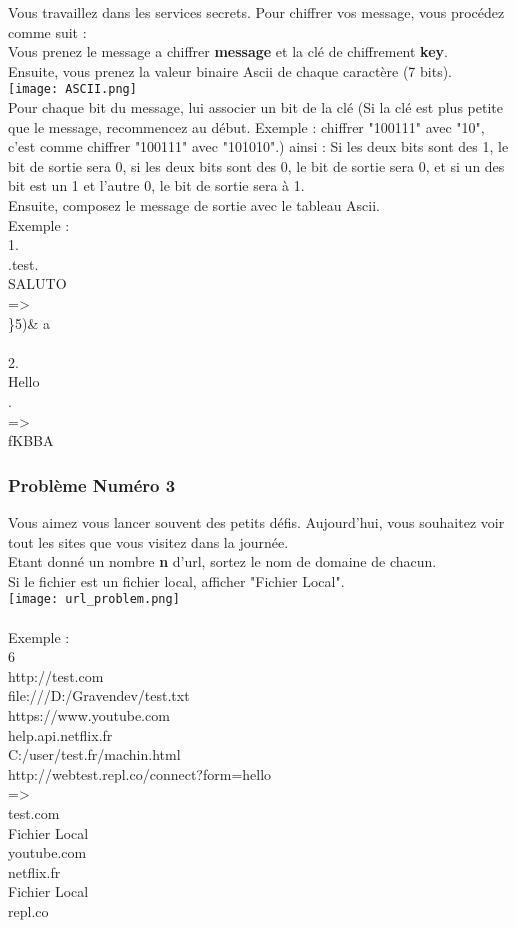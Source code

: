 \documentclass[12pt]{article}
\begin{document}
Vous travaillez dans les services secrets. Pour chiffrer vos message, vous procédez comme suit :\\
Vous prenez le message a chiffrer \textbf{message} et la clé de chiffrement \textbf{key}.\\
Ensuite, vous prenez la valeur binaire Ascii de chaque caractère (7 bits).\\
\texttt{[image: ASCII.png]}\\
Pour chaque bit du message, lui associer un bit de la clé (Si la clé est plus petite que le message, recommencez au début. Exemple : chiffrer "100111" avec "10", c'est comme chiffrer "100111" avec "101010".) ainsi : Si les deux bits sont des 1, le bit de sortie sera 0, si les deux bits sont des 0, le bit de sortie sera 0, et si un des bit est un 1 et l'autre 0, le bit de sortie sera à 1.\\
Ensuite, composez le message de sortie avec le tableau Ascii.\\
Exemple :\\
1.\\
.test.\\
SALUTO\\
=\textgreater\\
\}5)\& a
\\\\
2.\\
Hello\\
.\\
=\textgreater\\
fKBBA

\subsubsection{Problème Numéro 3}

Vous aimez vous lancer souvent des petits défis. Aujourd'hui, vous souhaitez voir tout les sites que vous visitez dans la journée.\\
Etant donné un nombre \textbf{n} d'url, sortez le nom de domaine de chacun.\\
Si le fichier est un fichier local, afficher "Fichier Local".\\
\texttt{[image: url\_problem.png]}
\\\\
Exemple :\\
6\\
http://test.com\\
file:///D:/Gravendev/test.txt\\
https://www.youtube.com\\
help.api.netflix.fr\\
C:/user/test.fr/machin.html\\
http://webtest.repl.co/connect?form=hello\\
=\textgreater\\
test.com\\
Fichier Local\\
youtube.com\\
netflix.fr\\
Fichier Local\\
repl.co
\end{document}

